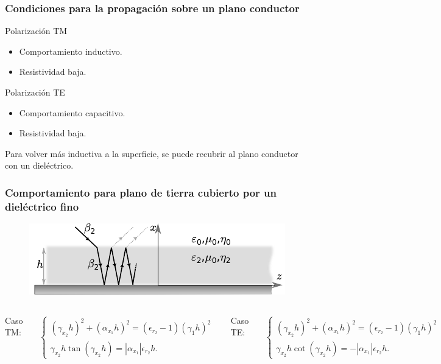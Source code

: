 \documentclass{beamer}
\begin{document}
		\begin{frame}
		\frametitle{Condiciones para la propagación sobre un plano conductor}
		
			\begin{block}{Polarización TM}
				\begin{itemize}
					\item Comportamiento {\color{red} inductivo}.
					\item Resistividad baja.
				\end{itemize}
			\end{block}
			\begin{block}{Polarización TE}
				\begin{itemize}
					\item Comportamiento {\color{red} capacitivo}.
					\item Resistividad baja.
				\end{itemize}
			\end{block}
		
			Para volver más inductiva a la superficie, se puede recubrir al plano conductor con un dieléctrico.
		\end{frame}
	
		\begin{frame}
			\frametitle{Comportamiento para plano de tierra cubierto por un dieléctrico fino}
			\begin{figure}[h]
				\includegraphics[width=\textwidth]{intro_electro/incidencia-coated-conductor.pdf}
			\end{figure}
		
			\begin{columns}[c]
				\column{.54\textwidth}
				\centering Caso TM:
				
				\begin{align*}
					\begin{cases}
						(\gamma_{x_2} h)^2 + (\alpha_{x_1} h)^2 = (\epsilon_{r_2} - 1) (\gamma_1 h)^2\\
						\gamma_{x_2} h \tan (\gamma_{x_2} h) = |\alpha_{x_1}| \epsilon_{r_2} h.
					\end{cases}
				\end{align*}
				
				\column{.45\textwidth}
				\centering Caso TE:
				
				\begin{align*}
					\begin{cases}
						(\gamma_{x_2} h)^2 + (\alpha_{x_1} h)^2 = (\epsilon_{r_2} - 1) (\gamma_1 h)^2 \\
						\gamma_{x_2} h \cot (\gamma_{x_2} h) = -|\alpha_{x_1}| \epsilon_{r_2} h.
					\end{cases}
				\end{align*}
	
			\end{columns}
		\end{frame}
		
\end{document}
